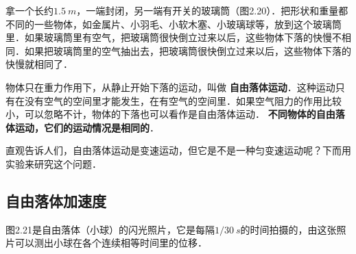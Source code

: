 拿一个长约$\qty{1.5}{m}$，一端封闭，另一端有开关的玻璃筒（图2.20）．把形状和重量都不同的一些物体，如金属片、小羽毛、小软木塞、小玻璃球等，放到这个玻璃筒里．如果玻璃筒里有空气，把玻璃筒很快倒立过来以后，这些物体下落的快慢不相同．如果把玻璃筒里的空气抽出去，把玻璃筒很快倒立过来以后，这些物体下落的快慢就相同了．

物体只在重力作用下，从静止开始下落的运动，叫做\textbf{ 自由落体运动}．这种运动只有在没有空气的空间里才能发生，在有空气的空间里．如果空气阻力的作用比较小，可以忽略不计，物体的下落也可以看作是自由落体运动．\textbf{ 不同物体的自由落体运动，它们的运动情况是相同的}．

直观告诉人们，自由落体运动是变速运动，但它是不是一种匀变速运动呢？下而用实验来研究这个问题．

\newpage

\subsection{自由落体加速度}
图2.21是自由落体（小球）的闪光照片，它是每隔$1/30~\si{s}$的时间拍摄的，由这张照片可以测出小球在各个连续相等时间里的位移．
